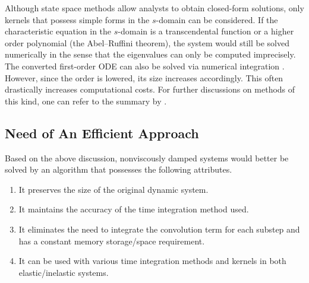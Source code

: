 Although state space methods allow analysts to obtain closed-form solutions, only kernels that possess simple forms in the $s$-domain can be considered. If the characteristic equation in the $s$-domain is a transcendental function or a higher order polynomial (the Abel--Ruffini theorem), the system would still be solved numerically in the sense that the eigenvalues can only be computed imprecisely. The converted first-order ODE can also be solved via numerical integration \citep{Adhikari2004,Ding2016}.
However, since the order is lowered, its size increases accordingly. This often drastically increases computational costs. For further discussions on methods of this kind, one can refer to the summary by \citet[][\S~1.3.1]{Adhikari2014}.
\subsection{Need of An Efficient Approach}
Based on the above discussion, nonviscously damped systems would better be solved by an algorithm that possesses the following attributes.
\begin{Objective}
\begin{enumerate}
\item It preserves the size of the original dynamic system.
\item It maintains the accuracy of the time integration method used.
\item It eliminates the need to integrate the convolution term for each substep and has a constant memory storage/space requirement.
\item It can be used with various time integration methods and kernels in both elastic/inelastic systems.
\end{enumerate}
\end{Objective}

